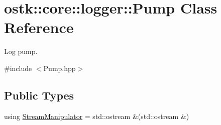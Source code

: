 \hypertarget{classostk_1_1core_1_1logger_1_1_pump}{}\section{ostk\+:\+:core\+:\+:logger\+:\+:Pump Class Reference}
\label{classostk_1_1core_1_1logger_1_1_pump}


Log pump.  




{\ttfamily \#include $<$Pump.\+hpp$>$}

\subsection*{Public Types}
\begin{DoxyCompactItemize}
\item 
using \hyperlink{classostk_1_1core_1_1logger_1_1_pump_a76c2ff8c48c3484e3ca179667a7a7b31}{Stream\+Manipulator} = std\+::ostream \&(std\+::ostream \&)
\end{DoxyCompactItemize}
